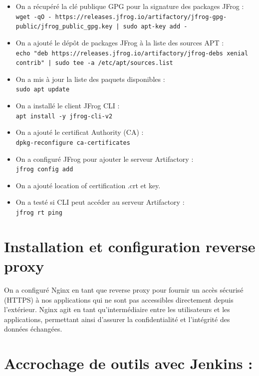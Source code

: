 \begin{itemize}
\item On a récupéré la clé publique GPG pour la signature des packages JFrog :\\
\texttt{wget -qO - https://releases.jfrog.io/artifactory/jfrog-gpg-public/jfrog\_public\_gpg.key | sudo apt-key add -}

\item On a ajouté le dépôt de packages JFrog à la liste des sources APT :\\
\texttt{echo "deb https://releases.jfrog.io/artifactory/jfrog-debs xenial contrib" | sudo tee -a /etc/apt/sources.list}

\item On a mis à jour la liste des paquets disponibles :\\
\texttt{sudo apt update}

\item On a installé le client JFrog CLI :\\
\texttt{apt install -y jfrog-cli-v2}

\item On a ajouté le certificat Authority (CA) :\\
\texttt{dpkg-reconfigure ca-certificates}

\item On a configuré JFrog pour ajouter le serveur Artifactory :\\
\texttt{jfrog config add}

\item On a ajouté location of certification .crt et key.

\item On a testé si CLI peut accéder au serveur Artifactory :\\
\texttt{jfrog rt ping}
\end{itemize}

\section*{Installation et configuration reverse proxy}

On a configuré Nginx en tant que reverse proxy pour fournir un accès sécurisé (HTTPS) à nos applications qui ne sont pas accessibles directement depuis l’extérieur. Nginx agit en tant qu’intermédiaire entre les utilisateurs et les applications, permettant ainsi d’assurer la confidentialité et l’intégrité des données échangées.
\section*{Accrochage de outils avec Jenkins :}

